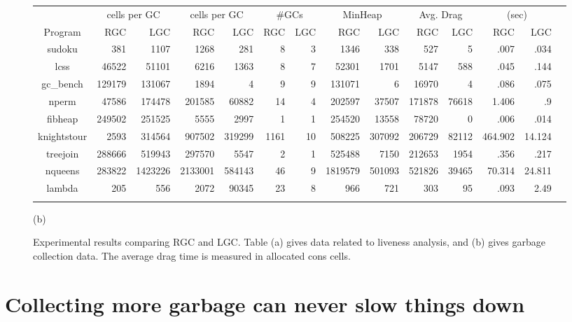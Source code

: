 \documentclass[9pt]{sigplanconf}
\begin{document}
\begin{figure}[t]
{\begin{tabular}{| c | r | r | r | r | r | r  |  r | r |
r | r | r | r | r |}
                            &   \multicolumn{2}{c|}{cells per GC}
                            &   \multicolumn{2}{c|}{cells per GC}
                            &   \multicolumn{2}{c|}{\#GCs}
                            &   \multicolumn{2}{c|}{MinHeap}
                            &   \multicolumn{2}{c|}{Avg. Drag}
                            &   \multicolumn{2}{c|}{(sec)} \\
\cline{2-13}
{Program}    &
RGC & LGC & RGC & LGC  & RGC & LGC  &   RGC & LGC & RGC & LGC & RGC &
LGC \\
\hline
\hline
    {\sf   sudoku}  &381 &1107 &1268 &281 &8 &3 & 1346  &338 &527 &5
&.007 & .034 \\
    {\sf  lcss } & 46522 &51101 &6216 &1363&8&7& 52301  &1701 &5147
&588 &.045 & .144 \\
    {\sf   gc\_bench}  &129179 &131067 &1894 &4&9&9& 131071   &6 &16970
 &4 &.086 & .075 \\
     {\sf  nperm}  & 47586  &174478 &201585 &60882&14&4& 202597  &37507
&171878 &76618 &1.406 & .9  \\
    {\sf  fibheap} &249502  &251525 &5555 &2997&1&1& 254520  &13558
&78720 &0 &.006 & .014  \\
    {\sf  knightstour}  &2593 &314564 &907502 &319299&1161&10&508225
&307092 &206729 &82112 &464.902 & 14.124  \\
    {\sf  treejoin} & 288666  &519943 &297570 &5547&2&1& 525488  &7150
&212653 &1954 &.356 & .217 \\
    {\sf   nqueens} & 283822 &1423226 &2133001 &584143&46&9& 1819579
&501093 &521826 &39465 &70.314 & 24.811 \\
    {\sf   lambda}  &205 & 556 &2072&90345 &23 &8&966 & 721  &303 &95
&.093 &2.49  \\
\\
 \hline
\end{tabular}}


\centerline{(b)}
\vskip -2mm
\caption{Experimental results comparing RGC and LGC. Table (a) gives
  data related to liveness analysis, and (b) gives garbage collection
  data. The average drag time is measured in allocated cons cells.}
\label{fig:experimental-results}
\normalsize
\end{figure}

\section{Collecting more garbage can never slow things down}
\label{sec:lgc-always-better}
\end{document}
